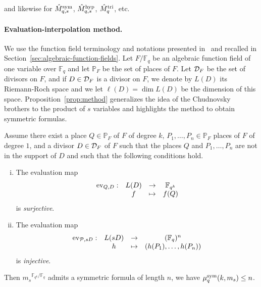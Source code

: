 \noindent and likewise for $\hat{M}^{\textrm{sym}}_{q,s}$, $\hat{M}^{\textrm{hyp}}_{q,s}$, $\hat{M}^{\textrm{tri}}_q$, etc.


\paragraph{Evaluation-interpolation method.}
We use the function field terminology and notations
presented in~\cite{Stichtenoth09} and recalled in
Section~\ref{sec:algebraic-function-fields}. Let $F/\mathbb{F}_q$ be an algebraic
function field of one variable over $\mathbb{F}_{q}$ and let $\mathbb{P}_F$ be the
set of places of $F$. Let $\mathcal{D}_F$ be the set of
divisors on $F$, and if $D\in\mathcal{D}_F$ is a divisor on
$F$, we denote by $L(D)$ its Riemann-Roch space and we let $\ell(D)=\dim L(D)$ be
the dimension of this space. Proposition~\ref{prop:method} generalizes the idea
of the Chudnovsky brothers to the product of $s$ variables and highlights the
method to obtain symmetric formulas.
\begin{prop}
  \label{prop:method}
  Assume there exist a place $Q\in\mathbb{P}_{F}$ of $F$ of degree $k$, $P_1,
  \dots, P_n\in\mathbb{P}_F$ places of $F$ of degree $1$, and a divisor
  $D\in\mathcal{D}_F$ of $F$ such that the places $Q$ and $P_1, \dots, P_n$ are not in
  the support of $D$ and such that the following conditions hold.
  \begin{enumerate}[(i)]
    \item \label{cond:hyper-1} The evaluation map
      \[
        \begin{array}{cccc}
        \operatorname{ev}_{Q, D}: & L(D) & \to & \mathbb{F}_{q^k}\\
  & f & \mapsto & f(Q)
\end{array}
\]
is \emph{surjective}.
    \item \label{cond:hyper-2} The evaluation map
      \[
        \begin{array}{cccc}
        \operatorname{ev}_{\mathcal{P}, sD}: & L(sD) & \to & (\mathbb{F}_{q})^n\\
  & h & \mapsto & (h(P_1), \dots, h(P_n))
\end{array}
\]
is \emph{injective}.
  \end{enumerate}
  Then ${m_s}^{\mathbb{F}_{q^k}/\mathbb{F}_q}$ admits a symmetric formula of length $n$, \ie we have $\mu^{\textrm{sym}}_q(k,m_s)\leq n$.
\end{prop}
